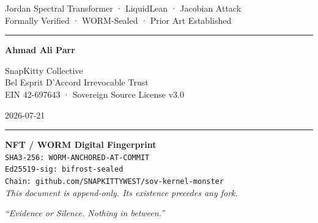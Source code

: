 \documentclass[12pt, letterpaper]{article}
\theoremstyle{plain}
\theoremstyle{definition}
\theoremstyle{remark}
\begin{document}
\begin{titlepage}
  \vspace{0.3cm}
  {\fontsize{13}{16}\selectfont\color{SovGray}
    Jordan Spectral Transformer · LiquidLean · Jacobian Attack \\[0.2em]
    Formally Verified · WORM-Sealed · Prior Art Established}

  \vspace{1.2cm}
  \textcolor{SovGold}{\rule{0.6\textwidth}{1pt}}

  \vspace{0.8cm}
  {\large\bfseries Ahmad Ali Parr}

  \vspace{0.2cm}
  {\normalsize\color{SovGray}
    SnapKitty Collective \\
    Bel Esprit D'Accord Irrevocable Trust \\
    EIN 42-697643 · Sovereign Source License v3.0}

  \vspace{0.4cm}
  {\small\color{SovGray} 2026-07-21}

  \vspace{1.2cm}
  \textcolor{SovGold}{\rule{0.6\textwidth}{0.5pt}}

  \vspace{0.8cm}
  \begin{wormbox}[width=0.75\textwidth]
    \centering\small
    \textbf{NFT / WORM Digital Fingerprint} \\[0.3em]
    \texttt{\color{WORMPurple}SHA3-256: WORM-ANCHORED-AT-COMMIT} \\
    \texttt{\color{SovBlue}Ed25519-sig: bifrost-sealed} \\
    \texttt{\color{SovGreen}Chain: github.com/SNAPKITTYWEST/sov-kernel-monster} \\[0.2em]
    \textit{This document is append-only. Its existence precedes any fork.}
  \end{wormbox}

  \vfill
  {\small\color{SovGray!60}
    \textit{``Evidence or Silence. Nothing in between.''}}
\end{titlepage}
\pagecolor{white}\color{SovBlack}
\end{document}
